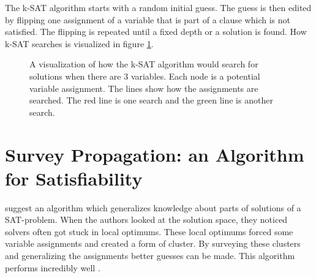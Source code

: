 \documentclass[msc,lith,english]{liuthesis}
\begin{document}
The k-SAT algorithm starts with a random initial guess. The guess is then edited by flipping one assignment of a variable that is part of a clause which is not satisfied. The flipping is repeated until a fixed depth or a solution is found.
How k-SAT searches is visualized in figure \ref{figKSATSearch}.

\cite{sourceProbAlgo}

\begin{center}
\begin{figure}[h]
\centering
{}
\caption{A visualization of how the k-SAT algorithm would search for solutions when there are 3 variables. Each node is a potential variable assignment. The lines show how the assignments are searched. The red line is one search and the green line is another search.}
\label{figKSATSearch}
\end{figure}
\end{center}

\section{Survey Propagation: an Algorithm for Satisfiability}
\citeauthor{sourceSurveyProp} suggest an algorithm which generalizes knowledge about parts of solutions of a SAT-problem. 
When the authors looked at the solution space, they noticed solvers often got stuck in local optimums.
These local optimums forced some variable assignments and created a form of cluster.
By surveying these clusters and generalizing the assignments better guesses can be made.
This algorithm performs incredibly well \cite{sourceSolutionSpace}. \cite{sourceSurveyProp}
\end{document}
